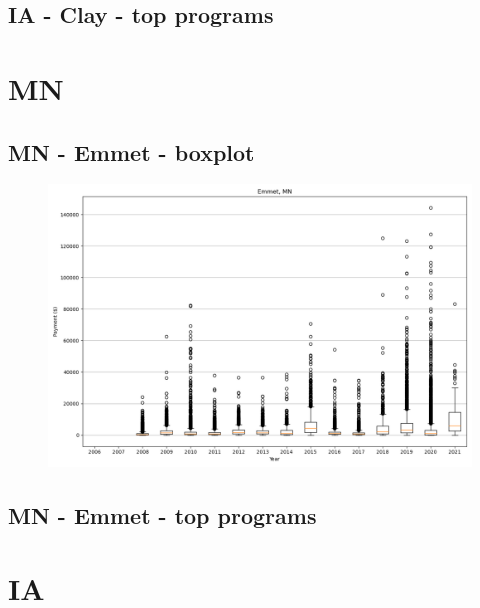 \subsection*{IA - Clay - top programs}

\newpage
\section*{MN}
\subsection*{MN - Emmet - boxplot}
\begin{figure}[h]
\centering
\includegraphics[width=7in]{../output/boxplots/counties/Emmet-MN_boxplot.png}
\end{figure}


\subsection*{MN - Emmet - top programs}

\newpage
\section*{IA}
